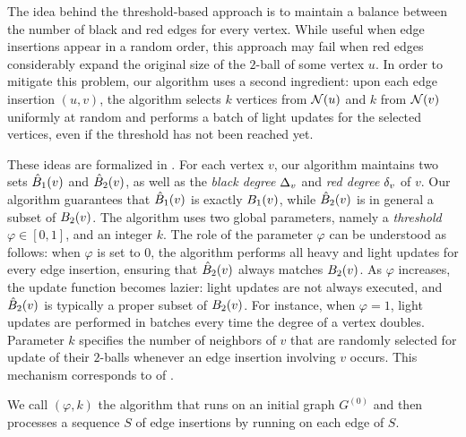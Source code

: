 The idea behind the threshold-based approach is to maintain a balance between the number of black and red edges for every vertex. While useful when edge insertions appear in a random order, this approach may fail when red edges considerably expand the original size of the $2$-ball of some vertex $u$. In order to mitigate this problem, our algorithm  uses a second ingredient: upon each edge insertion $(u,v)$, the algorithm selects $k$ vertices from $\neigh(u)$ and $k$ from $\neigh(v)$ uniformly at random and performs a batch of light updates for the selected vertices, even if the threshold has not been reached yet.

\iffalse
Notice that, if the number of red edges did not reach the threshold yet, there might be some vertex $w \in \neigh(u) \setminus \{v\}$ that is not aware of all the vertices contained in its own $2$-ball. In order to mitigate this, our algorithm will use another ingredient. At each edge insertion $(u,v)$, the algorithm selects uniformly at random $k$ vertices from $\neigh(u)$ and $k$ from $\neigh(v)$, and performs the batch of light updates for the selected vertices, even if the threshold has not yet been reached.
\fi

These ideas are formalized in . For each vertex $v$, our algorithm maintains two sets $\hat{B}_1(v)$ and $\hat{B}_2(v)$, as well as the \emph{black degree} $\Delta_v$ and \emph{red degree} $\delta_v$ of $v$.
Our algorithm guarantees that $\hat{B}_1(v)$ is exactly $B_1(v)$, while $\hat{B}_2(v)$ is in general a subset of $B_2(v)$. The algorithm uses two global parameters, namely a \textit{threshold} $\varphi \in [0,1]$, and an integer $k$. The role of the parameter $\varphi$ can be understood as follows: when $\varphi$ is set to $0$, the algorithm performs all heavy and light updates for every edge insertion, ensuring that $\hat{B}_2(v)$ always matches $B_2(v)$. As $\varphi$ increases, the update function becomes lazier: light updates are not always executed, and $\hat{B}_2(v)$ is typically a proper subset of $B_2(v)$. For instance, when $\varphi = 1$, light updates are performed in batches every time the degree of a vertex doubles. Parameter $k$ specifies the number of neighbors of $v$ that are randomly selected for update of their $2$-balls whenever an edge insertion involving $v$ occurs. This mechanism corresponds to  of . 

We call \lazyscheme$(\varphi,k)$ the algorithm that runs  on an initial graph $G^{(0)}$ and then processes a sequence $S$ of edge insertions by running  on each edge of $S$.  

